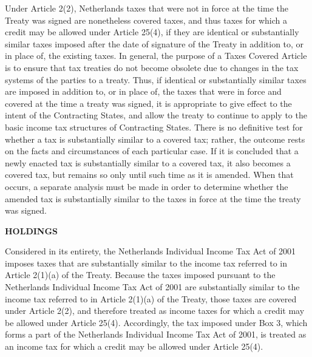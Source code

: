 \begin{select}
Under Article 2(2), Netherlands taxes that were not in force at the time the Treaty was signed are nonetheless covered 
taxes, and thus taxes for which a credit may be allowed under Article 25(4), if they are identical or substantially similar 
taxes imposed after the date of signature of the Treaty in addition to, or in place of, the existing taxes. 
In general, the purpose of a Taxes Covered Article is to ensure that tax treaties do not become obsolete due to changes 
in the tax systems of the parties to a treaty. Thus, if identical or substantially similar taxes are imposed in addition to, or in 
place of, the taxes that were in force and covered at the time a treaty was signed, it is appropriate to give effect to the intent 
of the Contracting States, and allow the treaty to continue to apply to the basic income tax structures of Contracting 
States. There is no definitive test for whether a tax is substantially similar to a covered tax; rather, the outcome rests on 
the facts and circumstances of each particular case. If it is concluded that a newly enacted tax is substantially similar to 
a covered tax, it also becomes a covered tax, but remains so only until such time as it is amended. When that occurs, a 
separate analysis must be made in order to determine whether the amended tax is substantially similar to the taxes in force 
at the time the treaty was signed. 

\begin{center} \textbf{HOLDINGS}
\end{center}

Considered in its entirety, the Netherlands Individual Income Tax Act of 2001 imposes taxes that are substantially 
similar to the income tax referred to in Article 2(1)(a) of the Treaty. Because the taxes imposed pursuant to the Netherlands 
Individual Income Tax Act of 2001 are substantially similar to the income tax referred to in Article 2(1)(a) of the Treaty, 
those taxes are covered under Article 2(2), and therefore treated as income taxes for which a credit may be allowed under 
Article 25(4). Accordingly, the tax imposed under Box 3, which forms a part of the Netherlands Individual Income Tax 
Act of 2001, is treated as an income tax for which a credit may be allowed under Article 25(4). 


\end{select}
